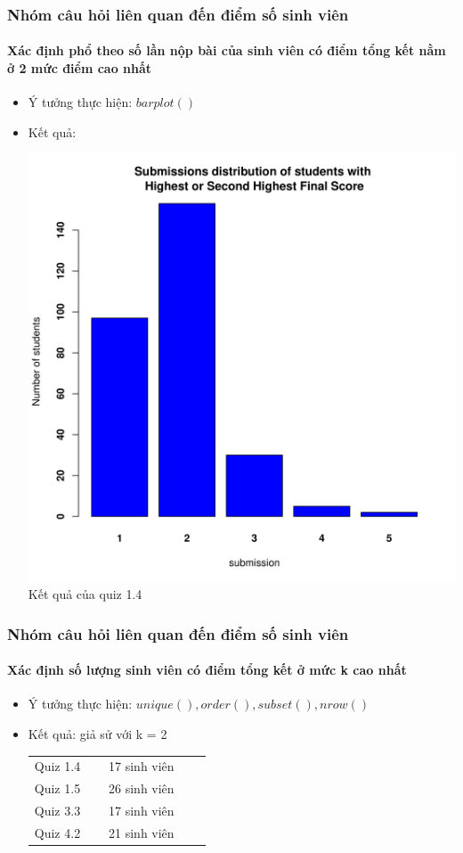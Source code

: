 \documentclass[english,10pt,table]{beamer}
\begin{document}
\frame
{
\frametitle{Nhóm câu hỏi liên quan đến điểm số sinh viên}
\framesubtitle{Xác định phổ theo số lần nộp bài của sinh viên có điểm tổng kết nằm ở 2 mức điểm cao nhất}
\begin{itemize}
    \item Ý tưởng thực hiện: $barplot()$
    \item Kết quả:\\
    \begin{center}
        \includegraphics[width = 6 cm]{Images/img2-5-1.png}\\
        Kết quả của quiz 1.4
    \end{center}
\end{itemize}
}

\frame
{
\frametitle{Nhóm câu hỏi liên quan đến điểm số sinh viên}
\framesubtitle{Xác định số lượng sinh viên có điểm tổng kết ở mức k cao nhất}
\begin{itemize}
    \item Ý tưởng thực hiện: $unique(), order(), subset(), nrow()$
    \item Kết quả: giả sử với k = 2\\
    \begin{center}
        \begin{tabular}{l l c c c}
             Quiz 1.4 & $\;$ & 17 sinh viên\\
             Quiz 1.5 & $\;$ & 26 sinh viên\\
             Quiz 3.3 & $\;$ & 17 sinh viên\\
             Quiz 4.2 & $\;$ & 21 sinh viên
        \end{tabular}
    \end{center}
\end{itemize}
}
\end{document}
